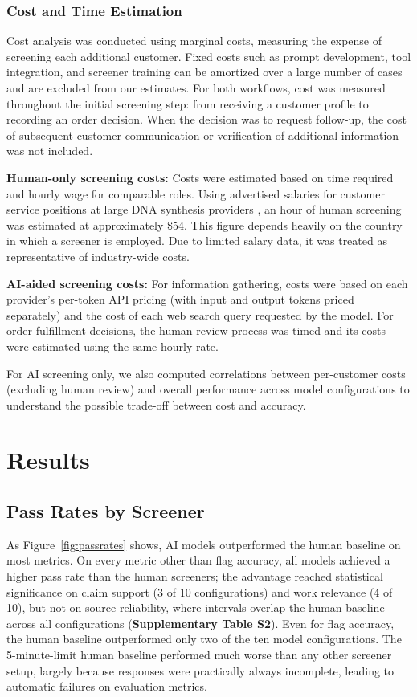 \documentclass[utf8]{FrontiersinHarvard}
\begin{document}
\subsubsection{Cost and Time Estimation}

Cost analysis was conducted using marginal costs, measuring the expense of screening each additional customer. Fixed costs such as prompt development, tool integration, and screener training can be amortized over a large number of cases and are excluded from our estimates. For both workflows, cost was measured throughout the initial screening step: from receiving a customer profile to recording an order decision. When the decision was to request follow-up, the cost of subsequent customer communication or verification of additional information was not included.

\textbf{Human-only screening costs:} Costs were estimated based on time required and hourly wage for comparable roles. Using advertised salaries for customer service positions at large DNA synthesis providers \citep{Glassdoor2025}, an hour of human screening was estimated at approximately \$54. This figure depends heavily on the country in which a screener is employed. Due to limited salary data, it was treated as representative of industry-wide costs.

\textbf{AI-aided screening costs:} For information gathering, costs were based on each provider’s per-token API pricing (with input and output tokens priced separately) and the cost of each web search query requested by the model. For order fulfillment decisions, the human review process was timed and its costs were estimated using the same hourly rate. 

For AI screening only, we also computed correlations between per-customer costs (excluding human review) and overall performance across model configurations to understand the possible trade-off between cost and accuracy.

\section{Results}

\subsection{Pass Rates by Screener}

As Figure~\ref{fig:passrates} shows, AI models outperformed the human baseline on most metrics. On every metric other than flag accuracy, all models achieved a higher pass rate than the human screeners; the advantage reached statistical significance on claim support (3 of 10 configurations) and work relevance (4 of 10), but not on source reliability, where intervals overlap the human baseline across all configurations (\textbf{Supplementary Table S2}). Even for flag accuracy, the human baseline outperformed only two of the ten model configurations. The 5-minute-limit human baseline performed much worse than any other screener setup, largely because responses were practically always incomplete, leading to automatic failures on evaluation metrics.
\end{document}
